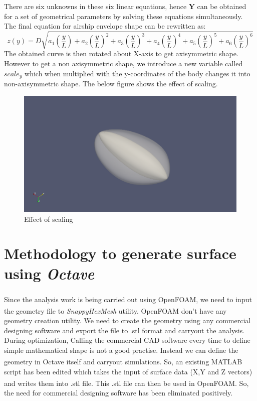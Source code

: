 There are six unknowns in these six linear equations, hence $\bm{Y}$ can be obtained for a set of geometrical parameters by solving these equations simultaneously. The final equation for airship envelope shape can be rewritten as:
\begin{equation}
\label{eq28}
z(y) = D\sqrt{a_1\left(\dfrac{y}{L}\right) + a_2\left(\dfrac{y}{L}\right)^2 + a_3\left(\dfrac{y}{L}\right)^3 + a_4\left(\dfrac{y}{L}\right)^4 + a_5\left(\dfrac{y}{L}\right)^5 +  a_6\left(\dfrac{y}{L}\right)^6}	
\end{equation}
The obtained curve is then rotated about X-axis to get axisymmetric shape. However to get a non axisymmetric shape, we introduce a new variable called $ scale_y $ which when multiplied with the y-coordinates of the body changes it into non-axisymmetric shape. The below figure shows the effect of scaling.
\begin{figure}[htbp]
	\centering
	\includegraphics[width=200 pt]{rnd/effect_of_scaling.png}
	\caption{Effect of scaling }
	\label{Effect of scaling}
\end{figure}


\section{Methodology to generate surface using \textit{Octave}}

Since the analysis work is being carried out using OpenFOAM\textsuperscript{\textregistered}, we need to input the geometry file to \textit{SnappyHexMesh} utility. OpenFOAM\textsuperscript{\textregistered} don't have any geometry creation utility. We need to create the geometry using any commercial designing software and export the file to .stl format and carryout the analysis. During optimization, Calling the commercial CAD software every time to define simple mathematical shape is not a good practise. Instead we can define the geometry in Octave itself and carryout simulations. So, an existing MATLAB\textsuperscript{\textregistered} script has been edited which takes the input of surface data  (X,Y and Z vectors) and writes them into .stl file. This .stl file can then be used in OpenFOAM\textsuperscript{\textregistered}. So, the need for commercial designing software has been eliminated positively.

